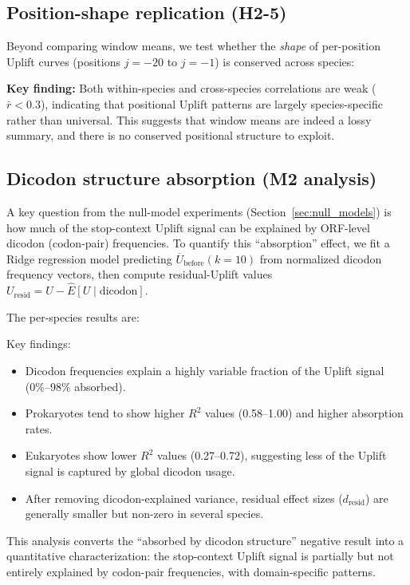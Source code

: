\subsection{Position-shape replication (H2-5)}
\label{sec:position_shape}

Beyond comparing window means, we test whether the \emph{shape} of per-position Uplift curves (positions $j=-20$ to $j=-1$) is conserved across species:


\textbf{Key finding:} Both within-species and cross-species correlations are weak ($\bar{r} < 0.3$), indicating that positional Uplift patterns are largely species-specific rather than universal.
This suggests that window means are indeed a lossy summary, and there is no conserved positional structure to exploit.

\subsection{Dicodon structure absorption (M2 analysis)}
\label{sec:dicodon_absorption}

A key question from the null-model experiments (Section~\ref{sec:null_models}) is how much of the stop-context Uplift signal can be explained by ORF-level dicodon (codon-pair) frequencies.
To quantify this ``absorption'' effect, we fit a Ridge regression model predicting $\overline{U}_{\mathrm{before}}(k=10)$ from normalized dicodon frequency vectors, then compute residual-Uplift values $U_{\mathrm{resid}} = U - \hat{E}[U \mid \text{dicodon}]$.

The per-species results are:


Key findings:
\begin{itemize}
\item Dicodon frequencies explain a highly variable fraction of the Uplift signal (0\%--98\% absorbed).
\item Prokaryotes tend to show higher $R^2$ values (0.58--1.00) and higher absorption rates.
\item Eukaryotes show lower $R^2$ values (0.27--0.72), suggesting less of the Uplift signal is captured by global dicodon usage.
\item After removing dicodon-explained variance, residual effect sizes ($d_{\mathrm{resid}}$) are generally smaller but non-zero in several species.
\end{itemize}

This analysis converts the ``absorbed by dicodon structure'' negative result into a quantitative characterization: the stop-context Uplift signal is partially but not entirely explained by codon-pair frequencies, with domain-specific patterns.

